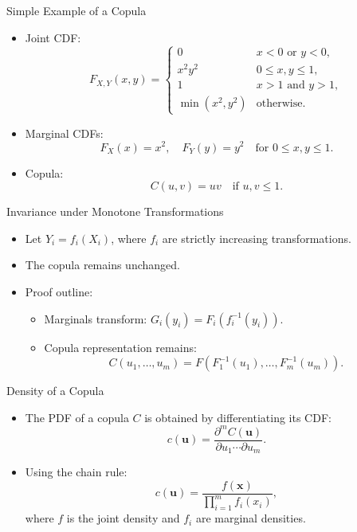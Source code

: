 \documentclass[11pt,handout,aspectratio=169]{beamer}
\begin{document}
\begin{frame}{Simple Example of a Copula}
\begin{itemize}
    \item Joint CDF:
    \[ F_{X,Y}(x, y) =
    \begin{cases} 
    0 & x < 0 \text{ or } y < 0, \\
    x^2 y^2 & 0 \leq x, y \leq 1, \\
    1 & x > 1 \text{ and } y > 1, \\
    \min(x^2, y^2) & \text{otherwise}.
    \end{cases} \]
    \item Marginal CDFs:
    \[ F_X(x) = x^2, \quad F_Y(y) = y^2 \quad \text{for } 0 \leq x, y \leq 1. \]
    \item Copula:
    \[ C(u, v) = uv \quad \text{if } u, v \leq 1. \]
\end{itemize}
\end{frame}

\begin{frame}{Invariance under Monotone Transformations}
\begin{itemize}
    \item Let $Y_i = f_i(X_i)$, where $f_i$ are strictly increasing transformations.
    \item The copula remains unchanged.
    \item Proof outline:
    \begin{itemize}
        \item Marginals transform: $G_i(y_i) = F_i(f_i^{-1}(y_i))$.
        \item Copula representation remains:
        \[ C(u_1, \ldots, u_m) = F(F_1^{-1}(u_1), \ldots, F_m^{-1}(u_m)). \]
    \end{itemize}
\end{itemize}
\end{frame}

\begin{frame}{Density of a Copula}
\begin{itemize}
    \item The PDF of a copula $C$ is obtained by differentiating its CDF:
    \[ c(\mathbf{u}) = \frac{\partial^m C(\mathbf{u})}{\partial u_1 \cdots \partial u_m}. \]
    \item Using the chain rule:
    \[ c(\mathbf{u}) = \frac{f(\mathbf{x})}{\prod_{i=1}^m f_i(x_i)}, \]
    where $f$ is the joint density and $f_i$ are marginal densities.
\end{itemize}
\end{frame}
\end{document}
